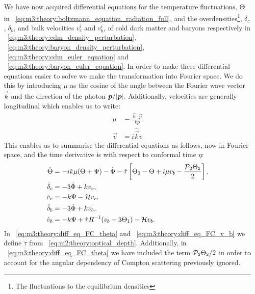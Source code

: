     We have now acquired differential equations for the temperature fluctuations, $\Theta$ in ~\cref{eq:m3:theory:boltzmann_equation_radiation_full}, and the overdensities\footnote{The fluctuations to the equilibrium densities}, $\delta_c$, $\delta_b$, and bulk velocities $v_c^i$ and $v_b^i$, of cold dark matter and baryons respectively in ~\cref{eq:m3:theory:cdm_density_perturbation}, ~\cref{eq:m3:theory:baryon_density_perturbation}, ~\cref{eq:m3:theory:cdm_euler_equation} and ~\cref{eq:m3:theory:baryon_euler_equation}. In order to make these differential equations easier to solve we make the transformation into Fourier space. We do this by introducing $\mu$ as the cosine of the angle between the Fourier wave vector $\vec{k}$ and the direction of the photon $\boldsymbol{p}/\abs{\boldsymbol{p}}$. Additionally, velocities are generally longitudinal which enables us to write:
    \begin{equation}\label{eq:m3:theory:mu_and_longitudinal_vel_def}
        \begin{split}
            \mu &\equiv \frac{\vec{k}\cdot\vec{p}}{kp} \\
            \vec{v} &= i\hat{\vec{k}}v
        \end{split}
    \end{equation}
    This enables us to summarise the differential equations as follows, now in Fourier space, and the time derivative is with respect to conformal time $\eta$:
    \begin{subequations}\label{eq:m3:theory:diff_eqs_fourier_conformal}
        \begin{align}
            \dot{\Theta} &= -ik\mu(\Theta+\Psi)-\dot{\Phi}-\dot{\tau}\left[\Theta_0-\Theta+i\mu v_b-\frac{\mathcal{P}_2\Theta_2}{2}\right], \label{eq:m3:theory:diff_eq_FC_theta}\\
            \dot{\delta}_c &= -3\dot{\Phi}+kv_c, \label{eq:m3:theory:diff_eq_FC_delta_c}\\
            \dot{v}_c &= -k\Psi-\mathcal{H} v_c, \label{eq:m3:theory:diff_eq_FC_v_c}\\
            \dot{\delta}_b &= -3\dot{\Phi} + kv_b, \label{eq:m3:theory:diff_eq_FC_delta_b}\\
            \dot{v}_b &= -k\Psi + \dot{\tau}R^{-1}(v_b+3\Theta_1) - \mathcal{H} v_b. \label{eq:m3:theory:diff_eq_FC_v_b}
        \end{align}
    \end{subequations}
    In ~\cref{eq:m3:theory:diff_eq_FC_theta} and ~\cref{eq:m3:theory:diff_eq_FC_v_b} we define $\dot{\tau}$ from ~\cref{eq:m2:theory:optical_depth}. Additionally, in ~\cref{eq:m3:theory:diff_eq_FC_theta} we have included the term $\mathcal{P}_2\Theta_2/2$ in order to account for the angular dependency of Compton scattering previously ignored. 

